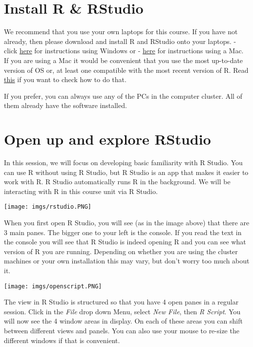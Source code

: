 \documentclass[
]{book}
\begin{document}
\section{Install R \& RStudio}\label{install-r-rstudio}

We recommend that you use your own laptops for this course. If you have not already, then please download and install R and RStudio onto your laptops.
- click \href{https://www.youtube.com/watch?v=eD07NznguA4}{here} for instructions using Windows or
- \href{https://www.youtube.com/watch?v=E8IFmqSXjDc}{here} for instructions using a Mac. If you are using a Mac it would be convenient that you use the most up-to-date version of OS or, at least one compatible with the most recent version of R. Read \href{https://www.howtogeek.com/350906/how-to-check-which-version-of-macos-youre-using/}{this} if you want to check how to do that.

If you prefer, you can always use any of the PCs in the computer cluster. All of them already have the software installed.

\section{Open up and explore RStudio}\label{open-up-and-explore-rstudio}

In this session, we will focus on developing basic familiarity with R Studio. You can use R without using R Studio, but R Studio is an app that makes it easier to work with R. R Studio automatically runs R in the background. We will be interacting with R in this course unit via R Studio.

\texttt{[image: imgs/rstudio.PNG]}

When you first open R Studio, you will see (as in the image above) that there are 3 main panes. The bigger one to your left is the console. If you read the text in the console you will see that R Studio is indeed opening R and you can see what version of R you are running. Depending on whether you are using the cluster machines or your own installation this may vary, but don't worry too much about it.

\texttt{[image: imgs/openscript.PNG]}

The view in R Studio is structured so that you have 4 open panes in a regular session. Click in the \emph{File} drop down Menu, select \emph{New File}, then \emph{R Script}. You will now see the 4 window areas in display. On each of these areas you can shift between different views and panels. You can also use your mouse to re-size the different windows if that is convenient.
\end{document}
